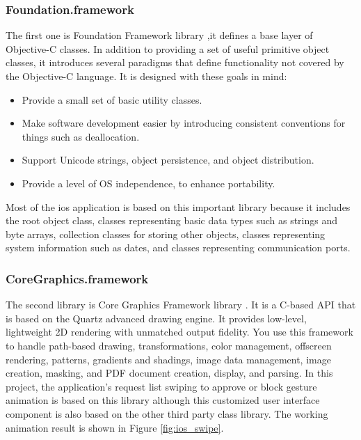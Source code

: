 \subsubsection{Foundation.framework}
\par The first one is Foundation Framework library \cite{foundationlib},it defines a base layer of Objective-C classes. In addition to providing a set of useful primitive object classes, it introduces several paradigms that define functionality not covered by the Objective-C language. It is designed with these goals in mind:
\begin{itemize}
  \item Provide a small set of basic utility classes.
  \item Make software development easier by introducing consistent conventions for things such as deallocation.
  \item Support Unicode strings, object persistence, and object distribution.
  \item Provide a level of OS independence, to enhance portability.
\end{itemize}
\par Most of the \gls{ios} application is based on this important library because it includes the root object class, classes representing basic data types such as strings and byte arrays, collection classes for storing other objects, classes representing system information such as dates, and classes representing communication ports.

\subsubsection{CoreGraphics.framework}
\par The second library is Core Graphics Framework library \cite{coregraphicslib}. It is a C-based API that is based on the Quartz advanced drawing engine. It provides low-level, lightweight 2D rendering with unmatched output fidelity. You use this framework to handle path-based drawing, transformations, color management, offscreen rendering, patterns, gradients and shadings, image data management, image creation, masking, and PDF document creation, display, and parsing. In this project, the application's request list swiping to approve or block gesture animation is based on this library although this customized user interface component is also based on the other third party class library. The working animation result is shown in Figure \ref{fig:ios_swipe}.

